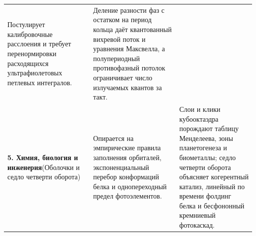 \begin{table}[htbp]
\begin{tabular}{@{}p{}p{}p{}@{}}
Постулирует калибровочные расслоения и требует перенормировки расходящихся ультрафиолетовых петлевых интегралов. &
Деление разности фаз с остатком на период кольца даёт квантованный вихревой поток и уравнения Максвелла, а полупериодный противофазный потолок ограничивает число излучаемых квантов за такт. \\
\addlinespace[3pt]
\textbf{5. Химия, биология и инженерия}\newline (Оболочки и седло четверти оборота) &
Опирается на эмпирические правила заполнения орбиталей, экспоненциальный перебор конформаций белка и однопереходный предел фотоэлементов. &
Слои и клики кубооктаэдра порождают таблицу Менделеева, зоны планетогенеза и биометаллы; седло четверти оборота объясняет когерентный катализ, линейный по времени фолдинг белка и бесфононный кремниевый фотокаскад. \\
\bottomrule
\end{tabular}
\end{table}

